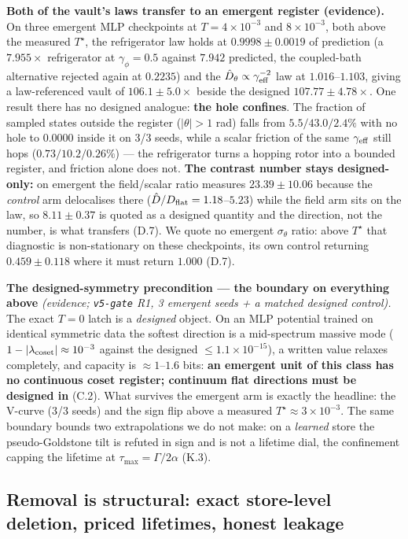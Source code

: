 \documentclass{article}
\begin{document}
\textbf{Both of the vault's laws transfer to an emergent register (evidence).} On three emergent MLP checkpoints at $T=4\times10^{-3}$ and $8\times10^{-3}$, both above the measured $T^\star$, the refrigerator law holds at $0.9998\pm0.0019$ of prediction (a $7.955\times$ refrigerator at $\gamma_\phi=0.5$ against $7.942$ predicted, the coupled-bath alternative rejected again at $0.2235$) and the $\hat D_\theta\propto\gamma_{\rm eff}^{-2}$ law at $1.016$--$1.103$, giving a law-referenced vault of $106.1\pm5.0\times$ beside the designed $107.77\pm4.78\times$. One result there has no designed analogue: \textbf{the hole confines}. The fraction of sampled states outside the register ($|\theta|>1$ rad) falls from $5.5/43.0/2.4\%$ with no hole to $0.0000$ inside it on 3/3 seeds, while a scalar friction of the same $\gamma_{\rm eff}$ still hops ($0.73/10.2/0.26\%$) --- the refrigerator turns a hopping rotor into a bounded register, and friction alone does not. \textbf{The contrast number stays designed-only:} on emergent the field/scalar ratio measures $23.39\pm10.06$ because the \emph{control} arm delocalises there ($\hat D/D_{\rm flat}=1.18$--$5.23$) while the field arm sits on the law, so $8.11\pm0.37$ is quoted as a designed quantity and the direction, not the number, is what transfers (D.7). We quote no emergent $\sigma_\theta$ ratio: above $T^\star$ that diagnostic is non-stationary on these checkpoints, its own control returning $0.459\pm0.118$ where it must return $1.000$ (D.7).

\textbf{The designed-symmetry precondition --- the boundary on everything above} \emph{(evidence; \texttt{v5-gate} R1, 3 emergent seeds + a matched designed control).} The exact $T=0$ latch is a \emph{designed} object. On an MLP potential trained on identical symmetric data the softest direction is a mid-spectrum massive mode ($1-|\lambda_{\rm coset}|\approx10^{-3}$ against the designed $\le1.1\times10^{-15}$), a written value relaxes completely, and capacity is $\approx1$--$1.6$ bits: \textbf{an emergent unit of this class has no continuous coset register; continuum flat directions must be designed in} (C.2). What survives the emergent arm is exactly the headline: the V-curve (3/3 seeds) and the sign flip above a measured $T^\star\approx3\times10^{-3}$. The same boundary bounds two extrapolations we do not make: on a \emph{learned} store the pseudo-Goldstone tilt is refuted in sign and is not a lifetime dial, the confinement capping the lifetime at $\tau_{\max}=\Gamma/2\alpha$ (K.3).

\subsection{Removal is structural: exact store-level deletion, priced lifetimes, honest leakage}
\end{document}
